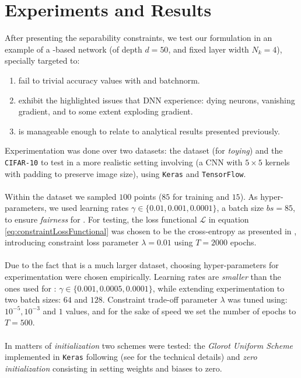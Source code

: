 \section{Experiments and Results}\label{sec:experiments}
After presenting the separability constraints, we test our formulation in an example of a \ReLU-based network (of depth $d=50$, and fixed layer width $N_k=4$), specially targeted to: 
\begin{enumerate}
    \item fail to trivial accuracy values with \ReLU and batchnorm.
    \item exhibit the highlighted issues that DNN experience: dying neurons, vanishing gradient, and to some extent exploding gradient.
    \item is manageable enough to relate to analytical results presented previously.
\end{enumerate}
Experimentation was done over two datasets: the \moons dataset (for \emph{toying}) and the \texttt{CIFAR-10} to test in a more realistic setting involving (a CNN with $5\times 5$ kernels with padding to preserve image size), using \texttt{Keras} and \texttt{TensorFlow}.
\\\\
Within the \moons dataset we sampled $100$ points ($85$ for training and $15$). As hyper-parameters, we used learning rates $\gamma \in \{0.01, 0.001, 0.0001\}$, a batch size $bs = 85$, to ensure \emph{fairness} for \SepUnit.  For testing, the loss functional $\mathcal{L}$ in equation \ref{eq:constraintLossFunctional}  was chosen to be the cross-entropy as presented in \cite{LeCun06atutorial}, introducing constraint loss parameter $\lambda = 0.01$ using $T = 2000$ epochs. 
\\\\
Due to the fact that \cifar is a much larger dataset, choosing hyper-parameters for experimentation were chosen empirically. Learning rates are \emph{smaller} than the ones used for \moons: $\gamma \in \{0.001, 0.0005, 0.0001 \}$, while extending experimentation to two batch sizes: $64$ and $128$.  Constraint trade-off parameter $\lambda$ was tuned using: $10^{-5},10^{-3}$ and $1$ values, and for the sake of speed we set the number of epochs to $T = 500$.
\\\\
In matters of \emph{initialization} two schemes were tested: the \emph{Glorot Uniform Scheme} implemented in \texttt{Keras} following (see \cite{Glorot10Initialization} for the technical details) and \emph{zero initialization} consisting in setting weights and biases to zero. 

